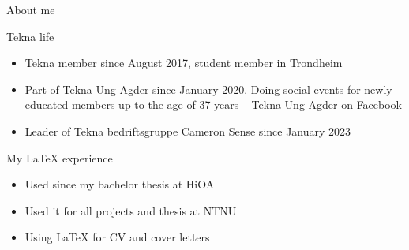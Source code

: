 \begin{frame}{About me}

\begin{alertblock}{Tekna life}
\begin{itemize}
    \item Tekna member since August 2017, student member in Trondheim
    \item Part of Tekna Ung Agder since January 2020. Doing social events for newly educated members up to the age of 37 years -- \href{https://www.facebook.com/groups/1077086612463991}{Tekna Ung Agder on Facebook}
    \item Leader of Tekna bedriftsgruppe Cameron Sense since January 2023
\end{itemize}
\end{alertblock}

\begin{block}{My \LaTeX{} experience}
\begin{itemize}
    \item Used since my bachelor thesis at HiOA
    \item Used it for all projects and thesis at NTNU
    \item Using \LaTeX{} for CV and cover letters
\end{itemize}
\end{block}

\end{frame}